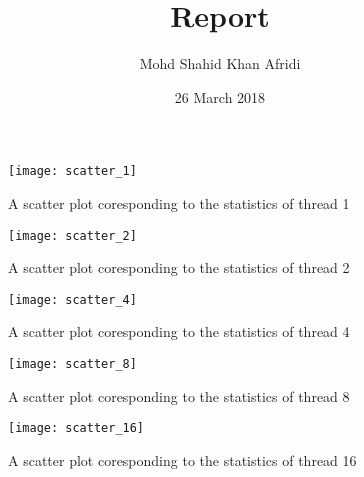 \documentclass{article}
\title{Report}
\author{Mohd Shahid Khan Afridi}
\date{26 March 2018}
\begin{document}
\maketitle
\newpage
\begin{figure*}[!ht]
    \centering
    \texttt{[image: scatter\_1]}
    
    \caption{A scatter plot coresponding to the statistics  of thread 1}
    \label{fig:sc1}
\end{figure*}
\begin{figure*}[!ht]
    \centering
    \texttt{[image: scatter\_2]}
    \caption{A scatter plot coresponding to the statistics  of thread 2}
    \label{fig:sc2}
\end{figure*}
\begin{figure*}[!ht]
    \centering
    \texttt{[image: scatter\_4]}
    \caption{A scatter plot coresponding to the statistics  of thread 4}
    \label{fig:sc4}
\end{figure*}
\begin{figure*}[!ht]
    \centering
    \texttt{[image: scatter\_8]}
    \caption{A scatter plot coresponding to the statistics  of thread 8}
    \label{fig:sc8}
\end{figure*}
\begin{figure*}[!ht]
    \centering
    \texttt{[image: scatter\_16]}
    \caption{A scatter plot coresponding to the statistics  of thread 16}
    \label{fig:sc16}
\end{figure*}

\end{document}
